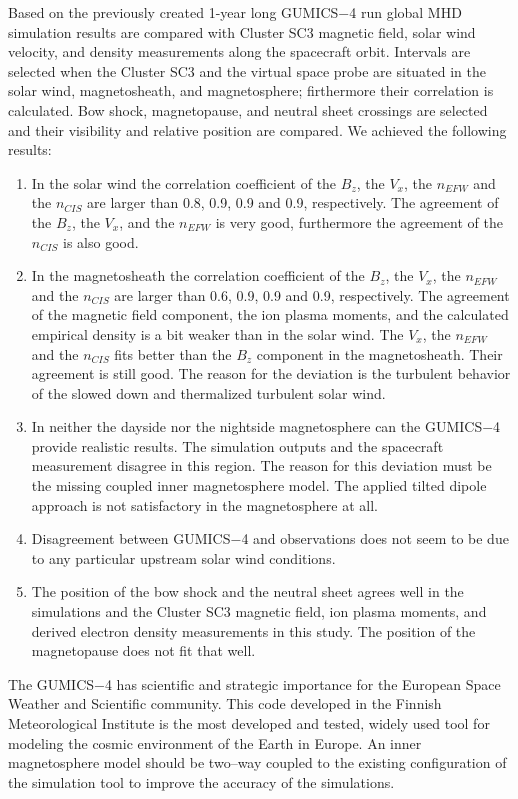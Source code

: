 \documentclass[linenumbers,draft]{agujournal}
\begin{document}
Based on the previously created 1-year long GUMICS$-$4 run global MHD simulation results are compared with Cluster SC3 magnetic field, solar wind velocity, and density measurements along the spacecraft orbit. Intervals are selected when the Cluster SC3 and the virtual space probe are situated in the solar wind, magnetosheath, and magnetosphere; firthermore their correlation is calculated. Bow shock, magnetopause, and neutral sheet crossings are selected and their visibility and relative position are compared. We achieved the following results:
\begin{enumerate}
\item In the solar wind the correlation coefficient of the $B_{z}$, the $V_{x}$, the $n_{EFW}$ and the $n_{CIS}$ are larger than 0.8, 0.9, 0.9 and 0.9, respectively. The agreement of the $B_{z}$, the $V_{x}$, and the $n_{EFW}$ is very good, furthermore the agreement of the $n_{CIS}$ is also good. 
\item In the magnetosheath the correlation coefficient of the $B_{z}$, the $V_{x}$, the $n_{EFW}$ and the $n_{CIS}$ are larger than 0.6, 0.9, 0.9 and 0.9, respectively. The agreement of the magnetic field component, the ion plasma moments, and the calculated empirical density is a bit weaker than in the solar wind. The $V_{x}$, the $n_{EFW}$ and the $n_{CIS}$ fits better than the $B_{z}$ component in the magnetosheath. Their agreement is still good. The reason for the deviation is the turbulent behavior of the slowed down and thermalized turbulent solar wind.
\item In neither the dayside nor the nightside magnetosphere can the GUMICS$-$4 provide realistic results. The simulation outputs and the spacecraft measurement disagree in this region. The reason for this deviation must be the missing coupled inner magnetosphere model. The applied tilted dipole approach is not satisfactory in the magnetosphere at all. 
\item Disagreement between GUMICS$-$4 and observations does not seem to be due to any particular upstream solar wind conditions.
\item The position of the bow shock and the neutral sheet agrees well in the simulations and the Cluster SC3 magnetic field, ion plasma moments, and derived electron density measurements in this study. The position of the magnetopause does not fit that well.
\end{enumerate}
The GUMICS$-$4 has scientific and strategic importance for the European Space Weather and Scientific community. This code developed in the Finnish Meteorological Institute is the most developed and tested, widely used tool for modeling the cosmic environment of the Earth in Europe. An inner magnetosphere model should be two--way coupled to the existing configuration of the simulation tool to improve the accuracy of the simulations.
\end{document}
